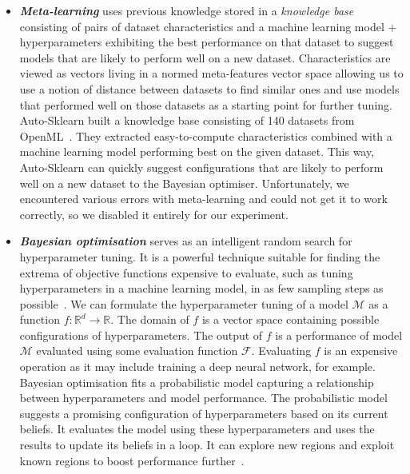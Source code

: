 \begin{itemize}

    \item \textbf{\emph{Meta-learning}} uses previous knowledge stored in a \emph{knowledge base}
        consisting of pairs of dataset characteristics and a machine learning model +
        hyperparameters exhibiting the best performance on that dataset to suggest models that are
        likely to perform well on a new dataset. Characteristics are viewed as vectors living in a
        normed meta-features vector space allowing us to use a notion of distance between datasets
        to find similar ones and use models that performed well on those datasets as a starting
        point for further tuning. Auto-Sklearn built a knowledge base consisting of 140 datasets
        from OpenML~\cite{openml}. They extracted easy-to-compute characteristics combined with a
        machine learning model performing best on the given dataset. This way, Auto-Sklearn can
        quickly suggest configurations that are likely to perform well on a new dataset to the
        Bayesian optimiser. Unfortunately, we encountered various errors with meta-learning and
        could not get it to work correctly, so we disabled it entirely for our experiment.

    \item \textbf{\emph{Bayesian optimisation}} serves as an intelligent random search for
        hyperparameter tuning. It is a powerful technique suitable for finding the extrema of
        objective functions expensive to evaluate, such as tuning hyperparameters in a machine
        learning model, in as few sampling steps as possible~\cite{bayesian-opt}. We can formulate
        the hyperparameter tuning of a model $\mathcal{M}$ as a function $f \colon \mathbb{R}^d \to
        \mathbb{R}$. The domain of $f$ is a vector space containing possible configurations of
        hyperparameters. The output of $f$ is a performance of model $\mathcal{M}$ evaluated using
        some evaluation function $\mathcal{F}$. Evaluating $f$ is an expensive operation as it may
        include training a deep neural network, for example. Bayesian optimisation fits a
        probabilistic model capturing a relationship between hyperparameters and model performance.
        The probabilistic model suggests a promising configuration of hyperparameters based on its
        current beliefs. It evaluates the model using these hyperparameters and uses the results to
        update its beliefs in a loop. It can explore new regions and exploit known regions to boost
        performance further~\cite{auto-sklearn-1.0}.


\end{itemize}
